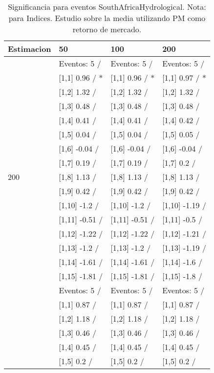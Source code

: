 \begin{table}

\caption{Significancia para eventos SouthAfricaHydrological. Nota: para Indices. Estudio sobre la media utilizando PM como retorno de mercado.}
\centering
\begin{tabular}[t]{llll}
\toprule
Estimacion & 50 & 100 & 200\\
\midrule
 & Eventos:  5 / & Eventos:  5 / & Eventos:  5 /\\
 & {}[1,1] 0.96  / * & {}[1,1] 0.96  / * & {}[1,1] 0.97  / *\\
 & {}[1,2] 1.32  / & {}[1,2] 1.32  / & {}[1,2] 1.32  /\\
 & {}[1,3] 0.48  / & {}[1,3] 0.48  / & {}[1,3] 0.48  /\\
 & {}[1,4] 0.41  / & {}[1,4] 0.41  / & {}[1,4] 0.42  /\\
\addlinespace
 & {}[1,5] 0.04  / & {}[1,5] 0.04  / & {}[1,5] 0.05  /\\
 & {}[1,6] -0.04  / & {}[1,6] -0.04  / & {}[1,6] -0.04  /\\
 & {}[1,7] 0.19  / & {}[1,7] 0.19  / & {}[1,7] 0.2  /\\
200 & {}[1,8] 1.13  / & {}[1,8] 1.13  / & {}[1,8] 1.13  /\\
 & {}[1,9] 0.42  / & {}[1,9] 0.42  / & {}[1,9] 0.42  /\\
\addlinespace
 & {}[1,10] -1.2  / & {}[1,10] -1.2  / & {}[1,10] -1.19  /\\
 & {}[1,11] -0.51  / & {}[1,11] -0.51  / & {}[1,11] -0.5  /\\
 & {}[1,12] -1.22  / & {}[1,12] -1.22  / & {}[1,12] -1.21  /\\
 & {}[1,13] -1.2  / & {}[1,13] -1.2  / & {}[1,13] -1.19  /\\
 & {}[1,14] -1.61  / & {}[1,14] -1.61  / & {}[1,14] -1.6  /\\
\addlinespace
 & {}[1,15] -1.81  / & {}[1,15] -1.81  / & {}[1,15] -1.8  /\\
 & Eventos:  5 / & Eventos:  5 / & Eventos:  5 /\\
 & {}[1,1] 0.87  / & {}[1,1] 0.87  / & {}[1,1] 0.87  /\\
 & {}[1,2] 1.18  / & {}[1,2] 1.18  / & {}[1,2] 1.18  /\\
 & {}[1,3] 0.46  / & {}[1,3] 0.46  / & {}[1,3] 0.46  /\\
\addlinespace
 & {}[1,4] 0.45  / & {}[1,4] 0.45  / & {}[1,4] 0.45  /\\
 & {}[1,5] 0.2  / & {}[1,5] 0.2  / & {}[1,5] 0.2  /\\

\end{tabular}
\end{table}
